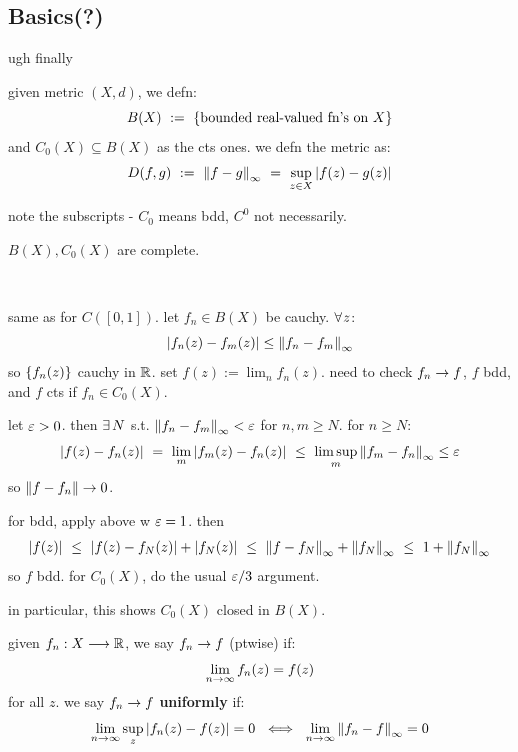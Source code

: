 \subsection{Basics(?)}
ugh finally

\begin{defn}
    given metric $(X,d)$, we defn:
	\begin{equation*}
	    B(X) \ := \ \left\{{\textrm{bounded real-valued fn's on } X}\right\}
	\end{equation*}
	and $C_{0}(X) \subseteq B(X)$ as the cts ones.
	we defn the metric as:
	\begin{equation*}
	    D(f,g) \ := \ \left\|f-g\right\|_{\infty}
		\ = \ \sup_{z\in X}\abs{f(z)-g(z)}
	\end{equation*}
\end{defn}
note the subscripts - $C_{0}$ means bdd, $C^{0}$ not necessarily.

\begin{thm}
    $B(X),C_{0}(X)$ are complete.
\end{thm} \

\begin{pf}[source=Primary Source Material]
	same as for $C([0,1])$.
	let $f_{n}\in B(X)$ be cauchy. $\fa z$:
	\begin{equation*}
	    \abs{f_{n}(z)-f_{m}(z)} \leq \left\|f_{n}-f_{m}\right\|_{\infty}
	\end{equation*}
	so $\left\{{f_{n}(z)}\right\}$ cauchy in $\mathbb{R}$. set $f(z):=\lim_{n}f_{n}(z)$.
	need to check $f_{n}\rightarrow f$, $f$ bdd, and $f$ cts if $f_{n}\in C_{0}(X)$.

	let $\varepsilon>0$. then $\ex N$ s.t. $\left\|f_{n}-f_{m}\right\|_{\infty}<\varepsilon$ for $n,m\geq N$.
	for $n\geq N$:
	\begin{equation*}
	    \abs{f(z)-f_{n}(z)} \ = \ \lim_{m}\abs{f_{m}(z)-f_{n}(z)}
		\ \leq \ \limsup_{m}\norm{f_{m}-f_{n}}_{\infty}\leq\ep
	\end{equation*}
	so $\left\|f-f_{n}\right\|\rightarrow0$.

	for bdd, apply above w $\varepsilon=1$. then
	\begin{equation*}
	    \abs{f(z)} \ \leq \ \abs{f(z)-f_{N}(z)} + \abs{f_{N}(z)}
		\ \leq \ \left\|f-f_{N}\right\|_{\infty} + \left\|f_{N}\right\|_{\infty} \ \leq \ 1 + \left\|f_{N}\right\|_{\infty} \end{equation*}
	so $f$ bdd. for $C_{0}(X)$, do the usual $\varepsilon/3$ argument.
\end{pf}
in particular, this shows $C_{0}(X)$ closed in $B(X)$.

\begin{defn}
	given $f_{n}:X\longrightarrow\mathbb{R}$, we say $f_{n}\rightarrow f$ (ptwise) if:
	\begin{equation*}
	    \lim_{n\rightarrow\infty}f_{n}(z)=f(z)
	\end{equation*}
	for all $z$. we say $f_{n}\rightarrow f$ \textbf{uniformly} if:
	\begin{equation*}
	    \lim_{n\sto\infty}\sup_{z}\abs{f_{n}(z)-f(z)}=0 \ \iff \
		\lim_{n\sto\infty}\norm{f_{n}-f}_{\infty}=0
	\end{equation*}
\end{defn} \

